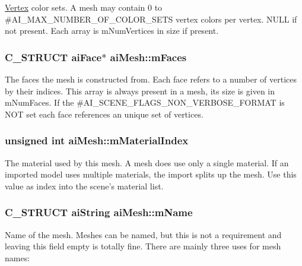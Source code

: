 \hyperlink{struct_vertex}{Vertex} color sets. A mesh may contain 0 to \#\+A\+I\+\_\+\+M\+A\+X\+\_\+\+N\+U\+M\+B\+E\+R\+\_\+\+O\+F\+\_\+\+C\+O\+L\+O\+R\+\_\+\+S\+E\+T\+S vertex colors per vertex. N\+U\+L\+L if not present. Each array is m\+Num\+Vertices in size if present. \hypertarget{structai_mesh_a5a65fbc7fdea7f8d36f39047425ece07}{
\subsubsection[{m\+Faces}]{\setlength{\rightskip}{0pt plus 5cm}C\+\_\+\+S\+T\+R\+U\+C\+T {\bf ai\+Face}$\ast$ ai\+Mesh\+::m\+Faces}}\label{structai_mesh_a5a65fbc7fdea7f8d36f39047425ece07}
The faces the mesh is constructed from. Each face refers to a number of vertices by their indices. This array is always present in a mesh, its size is given in m\+Num\+Faces. If the \#\+A\+I\+\_\+\+S\+C\+E\+N\+E\+\_\+\+F\+L\+A\+G\+S\+\_\+\+N\+O\+N\+\_\+\+V\+E\+R\+B\+O\+S\+E\+\_\+\+F\+O\+R\+M\+A\+T is N\+O\+T set each face references an unique set of vertices. \hypertarget{structai_mesh_aa2807c7ba172115203ed16047ad65f9e}{
\subsubsection[{m\+Material\+Index}]{\setlength{\rightskip}{0pt plus 5cm}unsigned int ai\+Mesh\+::m\+Material\+Index}}\label{structai_mesh_aa2807c7ba172115203ed16047ad65f9e}
The material used by this mesh. A mesh does use only a single material. If an imported model uses multiple materials, the import splits up the mesh. Use this value as index into the scene's material list. \hypertarget{structai_mesh_a8dd9433e0c5b008e3e5aee6c801d3b74}{
\subsubsection[{m\+Name}]{\setlength{\rightskip}{0pt plus 5cm}C\+\_\+\+S\+T\+R\+U\+C\+T {\bf ai\+String} ai\+Mesh\+::m\+Name}}\label{structai_mesh_a8dd9433e0c5b008e3e5aee6c801d3b74}
Name of the mesh. Meshes can be named, but this is not a requirement and leaving this field empty is totally fine. There are mainly three uses for mesh names\+:
